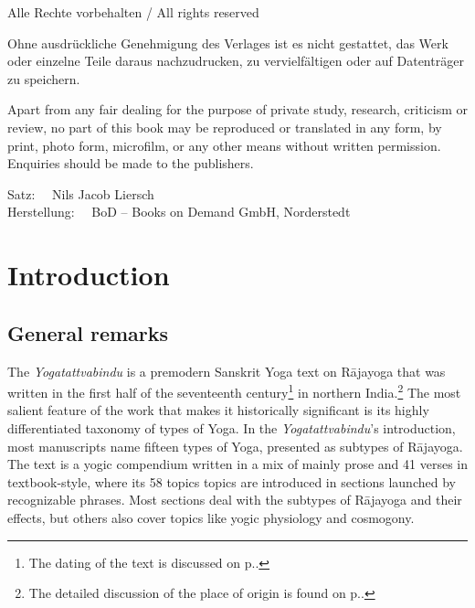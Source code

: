 \medskip

\noindent
Alle Rechte vorbehalten / All rights reserved

\medskip

\noindent
Ohne ausdrückliche Genehmigung des Verlages ist es nicht gestattet, das Werk oder einzelne Teile
daraus nachzudrucken, zu vervielfältigen oder auf Datenträger zu speichern.

\smallskip

\noindent
Apart from any fair dealing for the purpose of private study, research, criticism or review, no
part of this book may be reproduced or translated in any form, by print, photo form, microfilm, or
any other means without written permission. Enquiries should be made to the publishers.

\bigskip

\noindent
Satz: \ \ Nils Jacob Liersch \\
Herstellung: \ \ BoD – Books on Demand GmbH, Norderstedt  \\

\bigskip

\noindent

\normalsize

\newpage

\clearpage
\tableofcontents
\addtocounter{page}{-1}
\thispagestyle{empty}
\clearpage


\mainmatter

\chapter{Introduction}
\cleardoublepage

\section{General remarks}
The \textit{Yogatattvabindu} is a premodern Sanskrit Yoga text on Rājayoga that was written in the first half of the seventeenth century\footnote{The dating of the text is discussed on p.\pageref{dating}.} in northern India.\footnote{The detailed discussion of the place of origin is found on p.\pageref{placeoforigin}.} The most salient feature of the work that makes it historically significant is its highly differentiated taxonomy of types of Yoga. In the \textit{Yogatattvabindu}'s introduction, most manuscripts name fifteen types of Yoga, presented as subtypes of Rājayoga. The text is a yogic compendium written in a mix of mainly prose and 41 verses in textbook-style, where its 58 topics topics are introduced in sections launched by recognizable phrases. Most sections deal with the subtypes of Rājayoga and their effects, but others also cover topics like yogic physiology and cosmogony.

